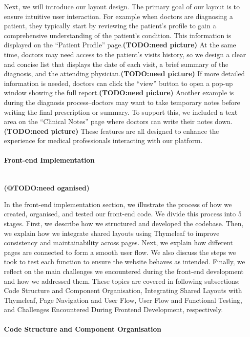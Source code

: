 Next, we will introduce our layout design. The primary goal of our layout is to ensure intuitive user interaction. For example when doctors are diagnosing a patient, they typically start by reviewing the patient’s profile to gain a comprehensive understanding of the patient’s condition. This information is displayed on the “Patient Profile” page.\textbf{(TODO:need picture)} At the same time, doctors may need access to the patient’s visits history, so we design a clear and concise list that displays the date of each visit, a brief summary of the diagnosis, and the attending physician.\textbf{(TODO:need picture)} If more detailed information is needed, doctors can click the “view” button to open a pop-up window showing the full report.\textbf{(TODO:need picture)} Another example is during the diagnosis process–doctors may want to take temporary notes before writing the final prescription or summary. To support this, we included a text area on the “Clinical Notes” page where doctors can write their notes down.\textbf{(TODO:need picture)} These features are all designed to enhance the experience for medical professionals interacting with our platform.



\paragraph{Front-end Implementation}\mbox{}\\
\textbf{(@TODO:need oganised)}

In the front-end implementation section, we illustrate the process of how we created, organised, and tested our front-end code. We divide this process into 5 stages. First, we describe how we structured and developed the codebase. Then, we explain how we integrate shared layouts using Thymeleaf to improve consistency and maintainability across pages. Next, we explain how different pages are connected to form a smooth user flow. We also discuss the steps we took to test each function to ensure the website behaves as intended. Finally, we reflect on the main challenges we encountered during the front-end development and how we addressed them. These topics are covered in following subsections: Code Structure and Component Organisation, Integrating Shared Layouts with Thymeleaf, Page Navigation and User Flow, User Flow and Functional Testing, and Challenges Encountered During Frontend Development, respectively.
\paragraph{Code Structure and Component Organisation}\mbox{}\\

